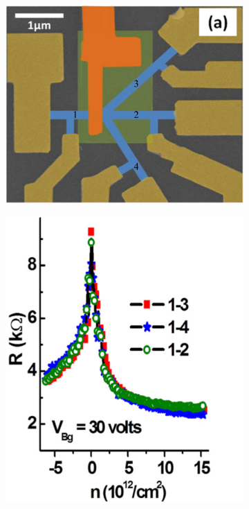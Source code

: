     \begin{figure}[H]
        \centering
        \begin{subfigure}[b]{0.5\linewidth}
            \includegraphics[width = \linewidth]{fig/Chap 2/angle-dependent transmission.png}
            \caption{}
            \label{2fig:3 arm device}
        \end{subfigure}
        \begin{subfigure}[b]{0.35\linewidth}
            \includegraphics[width = \linewidth]{fig/Chap 2/R vs V.png}

\end{subfigure}
\end{figure}
